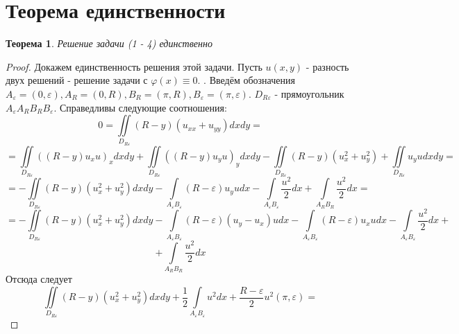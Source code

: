 \documentclass[a4paper, 11pt]{article}
\newtheorem{theorem}{Теорема}
\begin{document}
\section{Теорема единственности}
\begin{theorem}
	Решение задачи (1 - 4) единственно
\end{theorem}
\begin{proof}
		Докажем единственность решения этой задачи. Пусть $u(x,y)$ - разность двух решений - решение задачи с $\varphi(x) \equiv 0$. .\newline
	Введём обозначения $A_\varepsilon = (0, \varepsilon), A_R = (0, R), B_R = (\pi, R), B_\varepsilon = (\pi, \varepsilon)$. $D_{R\varepsilon}$ - прямоугольник $A_\varepsilon A_R B_R B_\varepsilon$. Справедливы следующие соотношения:
	\begin{equation*}
		0 = \iint\limits_{D_{R\varepsilon}} (R-y) (u_{xx} + u_{yy}) dx dy = 
	\end{equation*}
	\begin{equation*}
		=	\iint\limits_{D_{R\varepsilon}} \left( \left(R - y\right) u_x u\right)_x dx dy  + \iint\limits_{D_{R\varepsilon}} \left( \left(R - y\right) u_y u\right)_y dx dy  
		- \iint\limits_{D_{R\varepsilon}} \left(R- y\right) \left(u_x^2 + u_y^2\right) + \iint\limits_{D_{R\varepsilon}} u_y u dx dy = 
	\end{equation*}
	\begin{equation*}
		= - \iint\limits_{D_{R\varepsilon}} \left(R - y\right) \left(u_x^2 + u_y^2\right) dx dy
		- \int\limits_{A_\varepsilon B_\varepsilon} \left(R - \varepsilon\right) u_y u dx 
		-\int\limits_{A_\varepsilon B_\varepsilon} \dfrac{u^2}{2} dx + \int\limits_{A_R B_R} \dfrac{u^2}{2} dx = 
	\end{equation*}
	\begin{equation*}
		= - \iint\limits_{D_{R\varepsilon}} \left(R - y\right) \left(u_x^2 + u_y^2\right) dx dy - 
		\int\limits_{A_\varepsilon B_\varepsilon} \left(R - \varepsilon \right) \left(u_y - u_x\right)u dx - \int\limits_{A_\varepsilon B_\varepsilon} \left(R - \varepsilon\right) u_x u dx - \int\limits_{A_\varepsilon B_\varepsilon}\dfrac{u^2}{2} dx +
	\end{equation*}
	\begin{equation*}
		+ \int\limits_{A_R B_R} \dfrac{u^2}{2}dx
	\end{equation*}
	Отсюда следует
	\begin{equation*}
		\iint\limits_{D_{R\varepsilon}} \left(R - y\right) \left(u_x^2 + u_y^2\right) dx dy + \dfrac{1}{2}\int\limits_{A_\varepsilon B_\varepsilon} u^2 dx +\dfrac{R - \varepsilon}{2}u^2(\pi, \varepsilon)  =

\end{equation*}
\end{proof}
\end{document}
